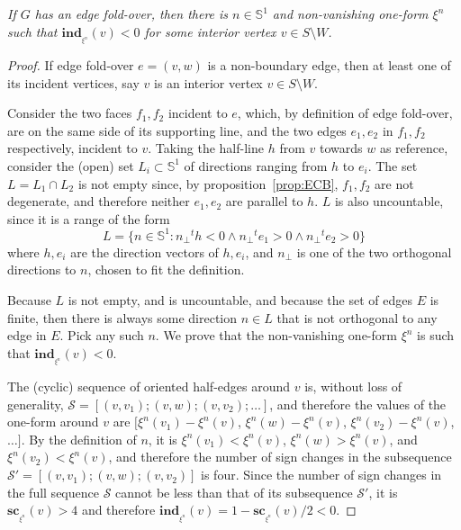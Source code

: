 \documentclass[11pt]{article}
\newcommand{\Sites}{S}
\begin{document}
\emph{
If $G$ has an edge fold-over, then there is $n\in\mathbb{S}^1$ and non-vanishing one-form $\xi^n$ such
that $\mathbf{ind}_{_{\xi^n}}(v) < 0$ for some interior vertex $v\in \Sites\setminus W$. }
\begin{proof}
If edge fold-over $e=(v,w)$ is a non-boundary edge, then at least one
of its incident vertices, say $v$ is an interior vertex $v\in
\Sites\setminus W$. 

Consider the two faces $f_1,f_2$ incident to $e$, which, by definition of
edge fold-over, are on the same side of its
supporting line, and the two edges $e_1,e_2$ in $f_1,f_2$ respectively,
incident to $v$. 
Taking the half-line $h$ from $v$ towards $w$ as reference, consider 
the (open) set $L_i\subset\mathbb{S}^1$ of directions ranging from $h$ to
$e_i$. 
The set $L=L_1\cap L_2$ is not empty since, by proposition~\ref{prop:ECB}, $f_1,f_2$ are not degenerate, and therefore neither $e_1,e_2$ are parallel
to $h$. $L$ is also uncountable, since it is a range of the form
\[ L = \{n\in\mathbb{S}^1 : 
			{n_{\perp}}^t {h} < 0 \wedge
			{n_{\perp}}^t {e}_1 > 0 \wedge
			{n_{\perp}}^t {e}_2 > 0\}\]
where ${h},{e}_i$ are the direction vectors of $h,e_i$, and
${n_\perp}$ is one of the two orthogonal directions to $n$, 
chosen to fit the definition. 

Because $L$ is not empty, and is uncountable, and because the set of edges $E$ is finite,
then there is always some direction $n\in L$ that is not orthogonal to any edge in
$E$. 
Pick any such $n$. 
We prove that the non-vanishing one-form $\xi^n$ is such that
$\mathbf{ind}_{_{\xi^n}}(v)<0$. 

The (cyclic) sequence of oriented half-edges {around} $v$ is, without loss of generality,
$\mathcal{S}=\left[(v,v_1);(v,w);(v,v_2);\dots\right]$, and therefore the values of the
one-form around $v$ are $[\xi^n(v_1)-\xi^n(v)$, $\xi^n(w)-\xi^n(v)$,
$\xi^n(v_2)-\xi^n(v)$, $\dots]$. 
By the definition of $n$, it is $\xi^n(v_1)<\xi^n(v)$, $\xi^n(w)>\xi^n(v)$,
and $\xi^n(v_2)<\xi^n(v)$, and therefore 
the number of sign changes in 
the subsequence
$\mathcal{S}'=[(v,v_1);(v,w);(v,v_2)]$ is four. 
Since the number of sign changes in the full sequence $\mathcal{S}$ cannot
be less
than that of its subsequence $\mathcal{S}'$, 
it is $\mathbf{sc}_{_{\xi^n}}(v)>4$ and therefore $\mathbf{ind}_{_{\xi^n}}(v)=1 - \mathbf{sc}_{_{\xi^n}}(v)/2 <0$. 
\end{proof}
\end{document}
